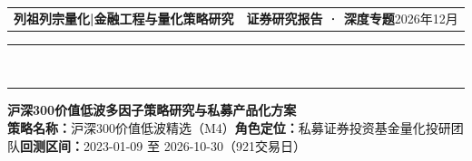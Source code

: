 \documentclass[12pt,a4paper]{article}
\begin{document}
\color{Ink}

\thispagestyle{empty}
{\setlength{\parindent}{0pt}\setlength{\parskip}{0pt}

\begin{tabularx}{\textwidth}{@{}X r@{}}
  {\sffamily\bfseries\fontsize{12}{13.5}\selectfont\textcolor{Primary}{列祖列宗量化}\hspace{0.45em}\textcolor{RuleMuted}{|}\hspace{0.45em}\fontsize{9.2}{11}\selectfont\textcolor{SubInk}{金融工程与量化策略研究}} &
  {\sffamily\fontsize{8.6}{10.5}\selectfont\textcolor{Primary}{\bfseries 证券研究报告 · 深度专题}\hspace{0.5em}\textcolor{SubInk}{2026年12月}}
\end{tabularx}
\vspace{1.5pt}
{\color{Primary}\rule{\textwidth}{1.5pt}}\\[-8.5pt]
{\color{RuleMuted}\rule{\textwidth}{0.4pt}}

\vspace{4pt}

{\sffamily\bfseries\fontsize{15}{19}\selectfont\textcolor{Ink}{沪深300价值低波多因子策略研究与私募产品化方案}}\\[2.5pt]
{\fontsize{7.45}{10}\selectfont\textcolor{SubInk}{\textbf{策略名称：}沪深300价值低波精选（M4）\hspace{0.45em}\textbf{角色定位：}私募证券投资基金量化投研团队\hspace{0.45em}\textbf{回测区间：}2023-01-09 至 2026-10-30（921交易日）}}

\vspace{4pt}

}
\end{document}
